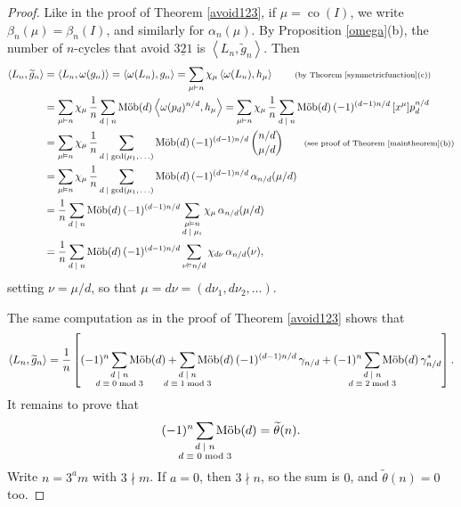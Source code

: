 \documentclass[12pt]{article}
\newcommand{\since}[1]{\tag*{\scriptsize{(#1)}}}
\DeclareMathOperator{\mob}{M\ddot{o}b}
\DeclareMathOperator{\co}{co}
\newcommand{\gam}{\gamma}
\newcommand{\ee}{\chi}
\theoremstyle{definition}
\begin{document}
\begin{proof}
Like in the proof of Theorem \ref{avoid123}, if $\mu = \co(I)$, we write $\beta_n(\mu) = \beta_n(I)$, and similarly for $\alpha_n(\mu)$. By Proposition \ref{omega}(b), the number of $n$-cycles that avoid $\underline{321}$ is $\left\langle L_n, \widetilde{g}_n \right\rangle$. Then
\begin{align*}
\left\langle L_n, \widetilde{g}_n \right\rangle &= \left\langle L_n, \omega(g_n) \right\rangle = \left\langle \omega(L_n), g_n \right\rangle = \sum_{\mu\vDash n} \ee_\mu \left\langle \omega(L_n), h_\mu \right\rangle \since{by Theorem \ref{symmetricfunction}(c)} \\
&= \sum_{\mu\vDash n} \ee_\mu \,\frac{1}{n} \sum_{\text{$d \mid n$}} \mob(d) \left\langle \omega(p_d)^{n/d}, h_\mu \right\rangle 
= \sum_{\mu\vDash n} \ee_\mu \,\frac{1}{n} \sum_{\text{$d \mid n$}} \mob(d)\,(-1)^{(d-1)n/d} \, [x^\mu]p_d^{n/d} \\
&= \sum_{\mu\vDash n} \ee_\mu \,\frac{1}{n} \sum_{\text{$d \mid \gcd(\mu_1,\ldots)$}} \mob(d)\,(-1)^{(d-1)n/d}\, \binom{n/d}{\mu/d} \since{see proof of Theorem \ref{maintheorem}(b)} \\
&= \sum_{\mu\vDash n} \ee_\mu \,\frac{1}{n} \sum_{\text{$d \mid \gcd(\mu_1,\ldots)$}} \mob(d)\,(-1)^{(d-1)n/d}\, \alpha_{n/d}(\mu/d) \\
&= \frac{1}{n} \sum_{\text{$d \mid n$}} \mob(d)\,(-1)^{(d-1)n/d} \sum_{\substack{\mu \vDash n \\ \text{$d \mid \mu_i$}}} \ee_\mu\,\alpha_{n/d}(\mu/d)\\
&= \frac{1}{n} \sum_{\text{$d \mid n$}} \mob(d)\,(-1)^{(d-1)n/d} \sum_{\nu \vDash n/d} \ee_{d\nu}\,\alpha_{n/d}(\nu),
\end{align*}
setting $\nu = \mu/d$, so that $\mu = d\nu = (d\nu_1, d\nu_2, \ldots)$.

The same computation as in the proof of Theorem \ref{avoid123} shows that
\[ \left\langle L_n, \widetilde{g}_n \right\rangle = \frac{1}{n} \left[ (-1)^n \sum_{\mathclap{\substack{\text{$d \mid n$}\\ \text{$d \equiv 0\bmod 3$}}}} \mob(d) + \sum_{\mathclap{\substack{\text{$d \mid n$}\\ \text{$d \equiv 1\bmod 3$}}}} \mob(d)\,(-1)^{(d-1)n/d} \,\gam_{n/d} + (-1)^n \sum_{\mathclap{\substack{\text{$d \mid n$}\\ \text{$d \equiv 2\bmod 3$}}}} \mob(d)\, \gam_{n/d}^*\right]. \]
It remains to prove that
\[ (-1)^n \sum_{\mathclap{\substack{\text{$d \mid n$}\\ \text{$d \equiv 0\bmod 3$}}}} \mob(d) = \widetilde{\theta}(n). \]
Write $n = 3^a m$ with $3\nmid m$. If $a = 0$, then $3\nmid n$, so the sum is $0$, and $\widetilde{\theta}(n) = 0$ too.


\end{proof}
\end{document}
